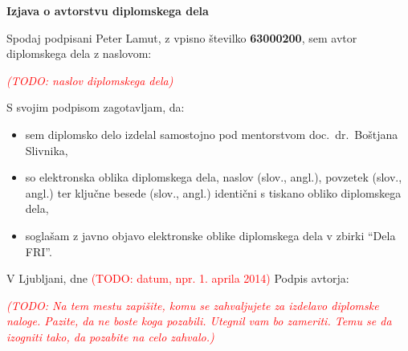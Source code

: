 \documentclass[a4paper, 12pt]{book}
\newcommand{\TODO}[1]{\textcolor{red}{(TODO: #1)}}
\newcommand{\clearemptydoublepage}{
	\newpage{\pagestyle{empty}\cleardoublepage}}
\begin{document}
\clearemptydoublepage


\label{izjava_avtorstvo}

\vspace*{1cm}
\begin{center} 
{\Large \textbf{\sc Izjava o avtorstvu diplomskega dela}}
\end{center}

\vspace{1cm}
\noindent Spodaj podpisani Peter Lamut,
z vpisno številko \textbf{63000200}, sem avtor diplomskega dela z naslovom:
   
\vspace{0.5cm}
\emph{\TODO{naslov diplomskega dela}}

\vspace{1.5cm}
\noindent S svojim podpisom zagotavljam, da:

\begin{itemize}
	\item sem diplomsko delo izdelal samostojno pod mentorstvom 
		doc.\ dr.\ Boštjana Slivnika,

	\item so elektronska oblika diplomskega dela, naslov (slov., angl.),
	 povzetek (slov., angl.) ter ključne besede (slov., angl.) identični
	 s tiskano obliko diplomskega dela,
	
	\item soglašam z javno objavo elektronske oblike diplomskega dela
	v zbirki ``Dela FRI''.
\end{itemize}

\vspace{1cm}

\noindent V Ljubljani, dne \TODO{datum, npr. 1. aprila 2014} \hfill
Podpis avtorja:

\clearemptydoublepage



\label{zahvala}
\thispagestyle{empty}\mbox{}\vfill\null\it%
\TODO{Na tem mestu zapišite, komu se zahvaljujete za izdelavo diplomske
naloge. Pazite, da ne boste koga pozabili. Utegnil vam bo zameriti. Temu
se da izogniti tako, da pozabite na celo zahvalo.}
\rm\normalfont

\clearemptydoublepage


\label{kazalo}
\def\thepage{}%
\tableofcontents{}
\end{document}
